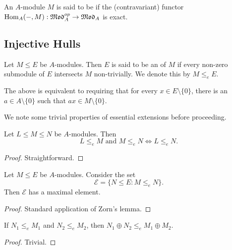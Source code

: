 \begin{definition}
    An $A$-module $M$ is said to be  if the (contravariant) functor $\operatorname{Hom}_A(-,M):\mathfrak{Mod}_A^{op}\to\mathfrak{Mod}_A$ is exact.
\end{definition}

\subsection{Injective Hulls}

\begin{definition}
    Let $M\le E$ be $A$-modules. Then $E$ is said to be an  of $M$ if every non-zero submodule of $E$ intersects $M$ non-trivially. We denote this by $M\le_e E$.
\end{definition}
\begin{remark}
    The above is equivalent to requiring that for every $x\in E\setminus\{0\}$, there is an $a\in A\setminus\{0\}$ such that $ax\in M\setminus\{0\}$.
\end{remark}

We note some trivial properties of essential extensions before proceeding.

\begin{proposition}
    Let $L\le M\le N$ be $A$-modules. Then 
    \begin{equation*}
        L\le_e M\text{ and } M\le_e N\iff L\le_e N.
    \end{equation*}
\end{proposition}
\begin{proof}
    Straightforward.
\end{proof}

\begin{proposition}
    Let $M\le E$ be $A$-modules. Consider the set 
    \begin{equation*}
        \mathcal E = \{N\le E\colon M\le_e N\}.
    \end{equation*}
    Then $\mathcal E$ has a maximal element.
\end{proposition}
\begin{proof}
    Standard application of Zorn's lemma.
\end{proof}

\begin{proposition}
    If $N_1\le_e M_1$ and $N_2\le_e M_2$, then $N_1\oplus N_2\le_e M_1\oplus M_2$.
\end{proposition}
\begin{proof}
    Trivial.
\end{proof}